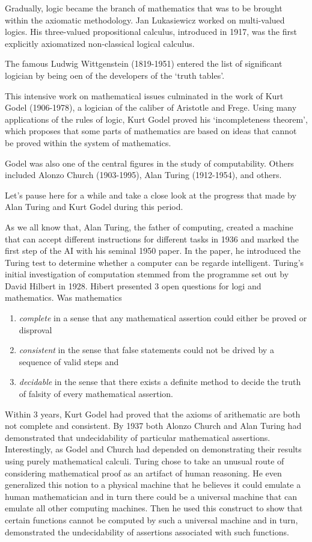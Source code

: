\documentclass[]{book}
\theoremstyle{definition}
\theoremstyle{definition}
\theoremstyle{definition}
\theoremstyle{remark}
\begin{document}
Gradually, logic became the branch of mathematics that was to be brought
within the axiomatic methodology. Jan Lukasiewicz worked on multi-valued
logics. His three-valued propositional calculus, introduced in 1917, was
the first explicitly axiomatized non-classical logical calculus.

The famous Ludwig Wittgenstein (1819-1951) entered the list of
significant logician by being oen of the developers of the `truth
tables'.

This intensive work on mathematical issues culminated in the work of
Kurt Godel (1906-1978), a logician of the caliber of Aristotle and
Frege. Using many applications of the rules of logic, Kurt Godel proved
his `incompleteness theorem', which proposes that some parts of
mathematics are based on ideas that cannot be proved within the system
of mathematics.

Godel was also one of the central figures in the study of computability.
Others included Alonzo Church (1903-1995), Alan Turing (1912-1954), and
others.

Let's pause here for a while and take a close look at the progress that
made by Alan Turing and Kurt Godel during this period.

As we all know that, Alan Turing, the father of computing, created a
machine that can accept different instructions for different tasks in
1936 and marked the first step of the AI with his seminal 1950 paper. In
the paper, he introduced the Turing test to determine whether a computer
can be regarde intelligent. Turing's initial investigation of
computation stemmed from the programme set out by David Hilbert in 1928.
Hibert presented 3 open questions for logi and mathematics. Was
mathematics

\begin{enumerate}
\def\labelenumi{\arabic{enumi}.}
\item
  \emph{complete} in a sense that any mathematical assertion could
  either be proved or disproval
\item
  \emph{consistent} in the sense that false statements could not be
  drived by a sequence of valid steps and
\item
  \emph{decidable} in the sense that there exists a definite method to
  decide the truth of falsity of every mathematical assertion.
\end{enumerate}

Within 3 years, Kurt Godel had proved that the axioms of arithematic are
both not complete and consistent. By 1937 both Alonzo Church and Alan
Turing had demonstrated that undecidability of particular mathematical
assertions. Interestingly, as Godel and Church had depended on
demonstrating their results using purely mathematical calculi. Turing
chose to take an unusual route of considering mathematical proof as an
artifact of human reasoning. He even generalized this notion to a
physical machine that he believes it could emulate a human mathematician
and in turn there could be a universal machine that can emulate all
other computing machines. Then he used this construct to show that
certain functions cannot be computed by such a universal machine and in
turn, demonstrated the undecidability of assertions associated with such
functions.
\end{document}
